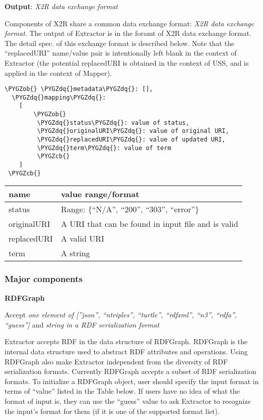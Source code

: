 \documentclass[letterpaper,10pt,english]{sphinxmanual}
\def\PYGZob{\char`\{}
\def\PYGZcb{\char`\}}
\def\PYGZdq{\char`\"}
\begin{document}
\textbf{Output}: \emph{X2R data exchange format}

Components of X2R share a common data exchange format: \emph{X2R data exchange format}. The output of Extractor is in the foramt of X2R data exchange format. The detail spec. of this exchange format is described below. Note that the ``replacedURI'' name/value pair is intentionally left blank in the context of Extractor (the potential replacedURI is obtained in the context of USS, and is applied in the context of Mapper).

\begin{Verbatim}[commandchars=\\\{\}]
\PYGZob{} \PYGZdq{}metadata\PYGZdq{}: [],
  \PYGZdq{}mapping\PYGZdq{}:
    [
        \PYGZob{}
         \PYGZdq{}status\PYGZdq{}: value of status,
         \PYGZdq{}originalURI\PYGZdq{}: value of original URI,
         \PYGZdq{}replacedURI\PYGZdq{}: value of updated URI,
         \PYGZdq{}term\PYGZdq{}: value of term
         \PYGZcb{}
    ]
 \PYGZcb{}
\end{Verbatim}

\begin{tabulary}{\linewidth}{|L|L|}
\hline
\textsf{\relax 
name
} & \textsf{\relax 
value range/format
}\\
\hline
status
 & 
Range: \{``N/A'', ``200'', ``303'', ``error''\}
\\

originalURI
 & 
A URI that can be found in input file and is valid
\\

replacedURI
 & 
A valid URI
\\

term
 & 
A string
\\
\hline\end{tabulary}



\subsubsection{Major components}
\label{docs/extractor:major-components}
\textbf{RDFGraph}

Accept \emph{one element of {[}''json'', ``ntriples'', ``turtle'', ``rdfxml'', ``n3'', ``rdfa'', ``guess''{]}} and \emph{string in a RDF serialization format}

Extractor accepts RDF in the data structure of RDFGraph. RDFGraph is the internal data structure used to abstract RDF attributes and operations. Using RDFGraph also make Extractor independent from the diversity of RDF serialization formats. Currently RDFGraph accepts a subset of RDF serialization formats. To initialize a RDFGraph object, user should specify the input format in terms of ``value'' listed in the Table below. If users have no idea of what the format of input is, they can use the ``guess'' value to ask Extractor to recognize the input's format for them (if it is one of the supported format list).
\end{document}
